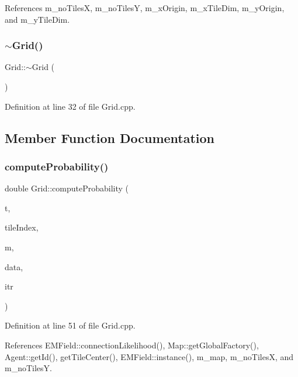 References m\+\_\+no\+TilesX, m\+\_\+no\+TilesY, m\+\_\+x\+Origin, m\+\_\+x\+Tile\+Dim, m\+\_\+y\+Origin, and m\+\_\+y\+Tile\+Dim.

\mbox{\label{class_grid_a3661d0a7f998caaaf8627d7a67072116}} 
\subsubsection{$\sim$\+Grid()}
{\footnotesize\ttfamily Grid\+::$\sim$\+Grid (\begin{DoxyParamCaption}{ }\end{DoxyParamCaption})\hspace{0.3cm}{\ttfamily [virtual]}}



Definition at line 32 of file Grid.\+cpp.



\subsection{Member Function Documentation}
\mbox{\label{class_grid_addfce41a6f3e3100f10dd2a0577fc35e}} 
\subsubsection{compute\+Probability()}
{\footnotesize\ttfamily double Grid\+::compute\+Probability (\begin{DoxyParamCaption}\item[{unsigned long}]{t,  }\item[{unsigned long}]{tile\+Index,  }\item[{\textbf{ Mobile\+Phone} $\ast$}]{m,  }\item[{vector$<$ \textbf{ Antenna\+Info} $>$ \&}]{data,  }\item[{std\+::pair$<$ \textbf{ um\+\_\+iterator}, \textbf{ um\+\_\+iterator} $>$}]{itr }\end{DoxyParamCaption})}



Definition at line 51 of file Grid.\+cpp.



References E\+M\+Field\+::connection\+Likelihood(), Map\+::get\+Global\+Factory(), Agent\+::get\+Id(), get\+Tile\+Center(), E\+M\+Field\+::instance(), m\+\_\+map, m\+\_\+no\+TilesX, and m\+\_\+no\+TilesY.

